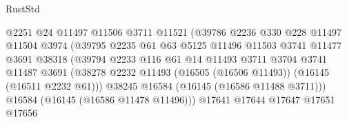 \begin{lexlean}{RustStd}
\begin{coremodule}
                                        @2251
                                        @24
                                        @11497
                                        @11506
                                        @3711
                                        @11521
                                        (@39786
                                          @2236
                                          @330
                                          @228
                                          @11497
                                          @11504
                                          @3974
                                          (@39795
                                            @2235
                                            @61
                                            @63
                                            @5125
                                            @11496
                                            @11503
                                            @3741
                                            @11477
                                            @3691
                                            @38318
                                            (@39794
                                              @2233
                                              @116
                                              @61
                                              @14
                                              @11493
                                              @3711
                                              @3704
                                              @3741
                                              @11487
                                              @3691
                                              (@38278
                                                @2232
                                                @11493
                                                (@16505 (@16506 @11493))
                                                (@16145 (@16511 @2232 @61)))
                                              @38245
                                              @16584
                                              (@16145 (@16586 @11488 @3711)))
                                            @16584
                                            (@16145 (@16586 @11478 @11496)))
                                          @17641
                                          @17644
                                          @17647
                                          @17651
                                          @17656

\end{coremodule}
\end{lexlean}
